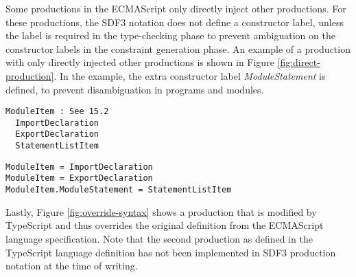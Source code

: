 Some productions in the ECMAScript only directly inject other productions.
For these productions, the SDF3 notation does not define a constructor label, unless the label is required in the type-checking phase to prevent ambiguation on the constructor labels in the constraint generation phase.
An example of a production with only directly injected other productions is shown in Figure \ref{fig:direct-production}.
In the example, the extra constructor label \textit{ModuleStatement} is defined, to prevent disambiguation in programs and modules.

\begin{figure*}
  \begin{minipage}[t]{.8\columnwidth}
    \begin{lstlisting}[caption=Definition of \textit{ModuleItem} in the ECMAScript language specification]
ModuleItem : See 15.2
  ImportDeclaration
  ExportDeclaration
  StatementListItem
    \end{lstlisting}
  \end{minipage}
  \hfill
  \begin{minipage}[t]{1.1\columnwidth}
    \begin{lstlisting}[caption=Definition of \textit{ModuleItem} in SDF3 production notation]
ModuleItem = ImportDeclaration
ModuleItem = ExportDeclaration
ModuleItem.ModuleStatement = StatementListItem
    \end{lstlisting}
  \end{minipage}
  \caption{The translation of \textit{ModuleItem} from the ECMAScript language specification to SDF3 production notation.}
  \label{fig:direct-production}
\end{figure*}

Lastly, Figure \ref{fig:override-syntax} shows a production that is modified by TypeScript and thus overrides the original definition from the ECMAScript language specification.
Note that the second production as defined in the TypeScript language definition has not been implemented in SDF3 production notation at the time of writing.

